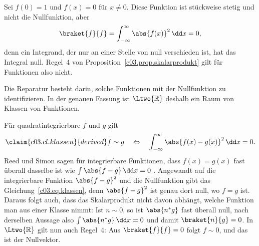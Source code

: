 \begin{fundament}[id=c03.f2,
    titel={Funktionen, die sich nur auf einer Nullmenge unterscheiden},
    wozu={Vertiefung~\ref{c03.v2} lässt offen, ob $\braket{f}{f} = 0$ nur für $f = 0$ gilt.
      Für Funktionen stimmt das nicht. Hier steht die Reparatur und was sie für den Wert
      einer Funktion an einer einzelnen Stelle bedeutet.},
    voraussetzung={Vertiefung~\ref{c03.v2}. Lebesgue-Maß und Lebesgue-Integral werden nur
      dem Namen nach benutzt.},
    zurueck={Zwei Funktionen, die sich nur an einzelnen Stellen unterscheiden, sind
      derselbe Vektor in $\Ltwo{\mathbb{R}}$. Der Wert an einer einzelnen Stelle hat keine
      Bedeutung, wohl aber Integrale über Intervalle.}]
  \begin{example}\label{c03.ex.punkt}
    Sei $f(0) = 1$ und $f(x) = 0$ für $x \neq 0$. Diese Funktion ist stückweise stetig und
    nicht die Nullfunktion, aber
    \begin{equation}\label{c03.eq.punkt}
      \braket{f}{f} = \int_{-\infty}^{\infty} \abs{f(x)}^2\, \dd x = 0 ,
    \end{equation}
    denn ein Integrand, der nur an einer Stelle von null verschieden ist, hat das Integral
    null. Regel~4 von Proposition~\ref{c03.prop.skalarprodukt} gilt für Funktionen also
    nicht.
  \end{example}

  Die Reparatur besteht darin, solche Funktionen mit der Nullfunktion zu identifizieren. In
  der genauen Fassung ist $\Ltwo{\mathbb{R}}$ deshalb ein Raum von Klassen von Funktionen.


  Für quadratintegrierbare $f$ und $g$ gilt
  \begin{equation}\label{c03.eq.klassen}\claim{c03.cl.klassen}{derived}
    f \sim g
    \quad \Leftrightarrow \quad
    \int_{-\infty}^{\infty} \abs{f(x) - g(x)}^2\, \dd x = 0 .
  \end{equation}
  Reed und Simon sagen für integrierbare Funktionen, dass $f(x) = g(x)$ fast überall dasselbe
  ist wie $\int \abs{f - g}\, \dd x = 0$ . Angewandt auf die
  integrierbare Funktion $\abs{f - g}^2$ und die Nullfunktion gibt das
  Gleichung~\eqref{c03.eq.klassen}, denn $\abs{f - g}^2$ ist genau dort null, wo $f = g$ ist.
  Daraus folgt auch, dass das Skalarprodukt nicht davon abhängt, welche Funktion man aus
  einer Klasse nimmt: Ist $n \sim 0$, so ist $\abs{n^* g}$ fast überall null, nach derselben
  Aussage also $\int \abs{n^* g}\, \dd x = 0$ und damit $\braket{n}{g} = 0$. In $\Ltwo{\mathbb{R}}$ gilt nun auch Regel~4: Aus
  $\braket{f}{f} = 0$ folgt $f \sim 0$, und das ist der Nullvektor.


\end{fundament}
